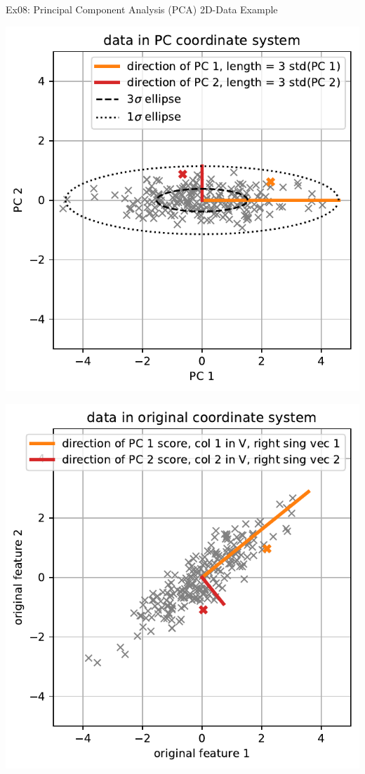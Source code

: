 \documentclass[mathserif, aspectratio=1610]{intbeamer}
\begin{document}
\begin{frame}[t]{Ex08: Principal Component Analysis (PCA) 2D-Data Example}
\begin{minipage}[t]{0.49\textwidth}
\includegraphics[width=\textwidth]{pca_2d_pc_data.pdf}
\end{minipage}
%
\begin{minipage}[t]{0.49\textwidth}
\includegraphics[width=\textwidth]{pca_2d_original_data_with_pcdir.pdf}
\end{minipage}
\end{frame}
\end{document}
